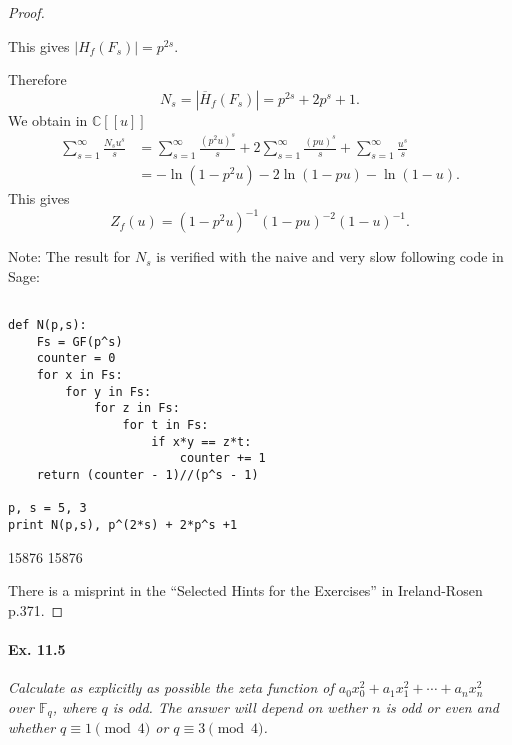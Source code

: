 \documentclass[11pt,a4paper]{article}
\newcommand{\C}{\mathbb{C}}
\newcommand{\F}{\mathbb{F}}
\begin{document}
\begin{proof}
\begin{enumerate}
This gives $|H_f(F_s)| = p^{2s}$.
\end{enumerate}
Therefore
$$N_s = |\overline{H}_f(F_s)| = p^{2s} + 2p^s + 1.$$
We obtain in $\C[[u]]$
\begin{align*}
\sum_{s=1}^\infty \frac{N_s u^s}{s} &= \sum_{s=1}^\infty \frac{(p^2u)^{s}}{s} + 2 \sum_{s=1}^\infty \frac{(pu)^{s}}{s} + \sum_{s=1}^\infty \frac{u^{s}}{s}\\
&= -\ln(1- p^2 u) - 2\ln(1-pu) - \ln(1-u).
\end{align*}
This gives
$$Z_f(u) = (1-p^2u)^{-1}(1-pu)^{-2}(1-u)^{-1}.$$

\bigskip

Note: The result for $N_s$ is verified with the naive and very slow following code in Sage:
\begin{verbatim}

def N(p,s):
    Fs = GF(p^s)
    counter = 0
    for x in Fs:
        for y in Fs:
            for z in Fs:
                for t in Fs:
                    if x*y == z*t:
                        counter += 1
    return (counter - 1)//(p^s - 1)

p, s = 5, 3
print N(p,s), p^(2*s) + 2*p^s +1
\end{verbatim}
\begin{center}
15876 15876
\end{center}
There is a misprint in the ``Selected Hints for the Exercises'' in Ireland-Rosen p.371.
\end{proof}

\paragraph{Ex. 11.5}{\it Calculate as explicitly as possible the zeta function of $a_0x_0^2+a_1x_1^2+\cdots+a_nx_n^2$ over $\F_q$, where $q$ is odd. The answer will depend on wether $n$ is odd or even and whether $q\equiv 1 \pmod 4$ or $q \equiv 3 \pmod 4$.
}
\end{document}
